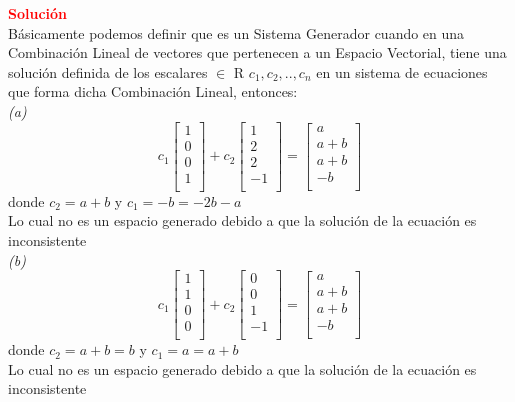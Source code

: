 \documentclass[12pt]{article}
\begin{document}
\noindent \textcolor{red}{\bf Soluci\'on}\\
Básicamente podemos definir que es un Sistema Generador cuando en una Combinación Lineal de vectores que pertenecen a un Espacio Vectorial, tiene una solución definida de los escalares $\in$ R $c_1,c_2,..,c_n$ en un sistema de ecuaciones que forma dicha Combinación Lineal, entonces:\\

\emph{(a)}
\[c_1
\begin{bmatrix}
    1  \\
    0  \\
    0  \\
    1  \\
\end{bmatrix}
+c_2 \begin{bmatrix}
    1  \\
    2  \\
    2  \\
    -1  \\
\end{bmatrix}
=
\begin{bmatrix}
    a  \\
    a+b  \\
    a+b \\
    -b  \\
\end{bmatrix}
\]
donde $c_2=a+b$ y $c_1=-b=-2b-a$\\
Lo cual no es un espacio generado debido a que la solución de la ecuación es inconsistente\\

\emph{(b)}
\[c_1
\begin{bmatrix}
    1  \\
    1  \\
    0  \\
    0  \\
\end{bmatrix}
+c_2 \begin{bmatrix}
    0  \\
    0  \\
    1  \\
    -1  \\
\end{bmatrix}
=
\begin{bmatrix}
    a  \\
    a+b  \\
    a+b \\
    -b  \\
\end{bmatrix}
\]
donde $c_2=a+b=b$ y $c_1=a=a+b$\\
Lo cual no es un espacio generado debido a que la solución de la ecuación es inconsistente\\
\end{document}

